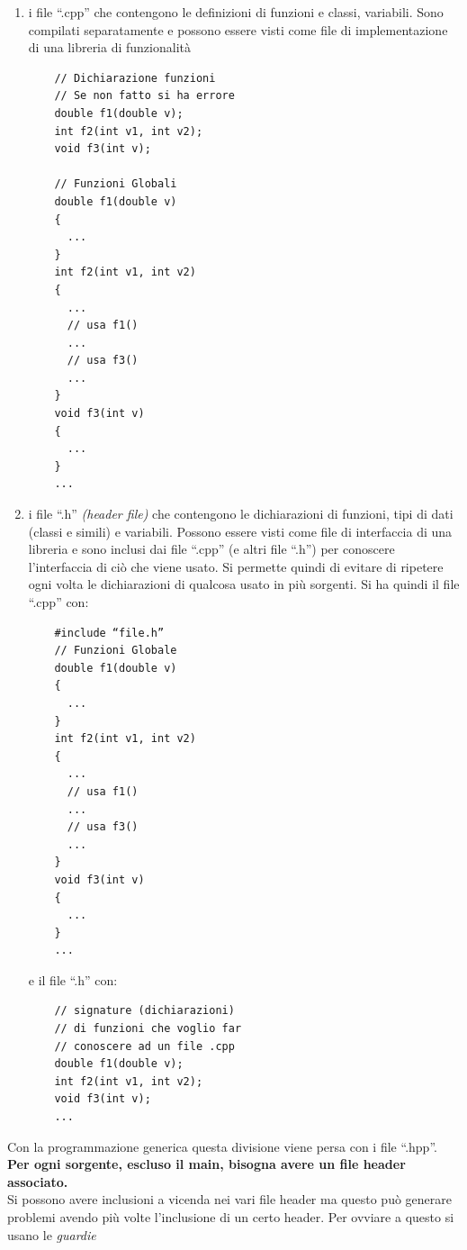 \documentclass[a4paper,12pt, oneside]{book}
\begin{document}
\begin{enumerate}
  \item i file ``.cpp'' che contengono le definizioni di funzioni e
  classi, variabili. Sono compilati separatamente e possono essere visti
  come file di implementazione di una libreria di funzionalità
  \begin{verbatim}
    // Dichiarazione funzioni
    // Se non fatto si ha errore
    double f1(double v);
    int f2(int v1, int v2);
    void f3(int v);

    // Funzioni Globali
    double f1(double v)
    {
      ...
    }
    int f2(int v1, int v2)
    {
      ...
      // usa f1()
      ...
      // usa f3()
      ...
    }
    void f3(int v)
    {
      ...
    }
    ...

  \end{verbatim}
  \item i file ``.h'' \textit{(header file)} che contengono le
  dichiarazioni di funzioni, tipi di dati (classi e simili) e
  variabili. Possono essere visti come file di interfaccia di una
  libreria e sono inclusi dai file ``.cpp'' (e altri file ``.h'') per
  conoscere l’interfaccia di ciò che viene usato. Si permette quindi
  di evitare di ripetere ogni volta le dichiarazioni di qualcosa usato
  in più sorgenti. Si ha quindi il file ``.cpp'' con:
  \begin{verbatim}
    #include “file.h”
    // Funzioni Globale
    double f1(double v)
    {
      ...
    }
    int f2(int v1, int v2)
    {
      ...
      // usa f1()
      ...
      // usa f3()
      ...
    }
    void f3(int v)
    {
      ...
    }
    ...

  \end{verbatim}
  \newpage
  e il file ``.h'' con:
  \begin{verbatim}
    // signature (dichiarazioni)
    // di funzioni che voglio far
    // conoscere ad un file .cpp
    double f1(double v);
    int f2(int v1, int v2);
    void f3(int v);
    ...

  \end{verbatim}
\end{enumerate}
Con la programmazione generica questa divisione viene persa con i file
``.hpp''.\\
\textbf{Per ogni sorgente, escluso il main, bisogna avere un file
  header associato.}\\
Si possono avere inclusioni a vicenda nei vari file header ma questo
può generare problemi avendo più volte l'inclusione di un certo
header. Per ovviare a questo si usano le \textit{guardie}
\end{document}
